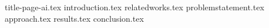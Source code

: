 \documentclass[a4paper,12pt]{report}
\begin{document}
{title-page-ai.tex}
\tableofcontents
{introduction.tex}
{relatedworks.tex}
{problemstatement.tex}
{approach.tex}
{results.tex}
{conclusion.tex}

\printbibliography
\end{document}
